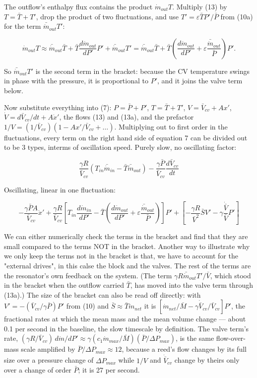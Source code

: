 \documentclass[11pt]{article}
\begin{document}
The outflow's enthalpy flux contains the product $\dot m_{out}T$. Multiply (13) by $T = \bar T + T'$, drop the product of two fluctuations, and use $T' = \varepsilon\bar TP'/\bar P$ from (10a) for the term $\bar{\dot m}_{out}T'$:

\begin{equation}
\dot m_{out}T \approx \bar{\dot m}_{out}\bar T + \bar T\frac{d\dot m_{out}}{dP'}P' + \bar{\dot m}_{out}T'
= \bar{\dot m}_{out}\bar T + \bar T\left(\frac{d\dot m_{out}}{dP'} + \varepsilon\frac{\bar{\dot m}_{out}}{\bar P}\right)P' . \tag{13a}
\end{equation}

So $\bar{\dot m}_{out}T'$ is the second term in the bracket: because the CV temperature swings in phase with the pressure, it is proportional to $P'$, and it joins the valve term below.

Now substitute everything into (7): $P = \bar P + P'$, $T = \bar T + T'$, $V = \bar V_{cv} + Ax'$, $\dot V = d\bar V_{cv}/dt + A\dot x'$, the flows (13) and (13a), and the prefactor $1/V = (1/\bar V_{cv})(1 - Ax'/\bar V_{cv} + \dots)$. Multiplying out to first order in the fluctuations, every term on the right hand side of equation 7 can be divided out to be 3 types, interms of oscillation speed. Purely slow, no oscillating factor:

\[
\frac{\gamma R}{\bar V_{cv}}\left(T_{in}\bar {\dot{m}}_{in} - \bar T\bar {\dot{m}}_{out}\right) - \frac{\gamma\bar P}{\bar V_{cv}}\frac{d\bar V_{cv}}{dt}
\]

Oscillating, linear in one fluctuation:

\[
-\frac{\gamma\bar PA}{\bar V_{cv}}\dot x' + \frac{\gamma R}{\bar V_{cv}}\left[T_{in}\frac{d\dot{m}_{in}}{dP'} - \bar T\left(\frac{d\dot{m}_{out}}{dP'} + \varepsilon\frac{\bar{\dot m}_{out}}{\bar P}\right)\right]P' + \left[-\frac{\gamma R}{\bar{V}^2} \bar{S} V' - \gamma \frac{\dot{\bar{V}}}{\bar{V}} P'\right]
\]

We can either numerically check the terms in the bracket and find that they are small compared to the terms NOT in the bracket. Another way to illustrate why we only keep the terms not in the bracket is that, we have to account for the "external drives", in this calse the block and the valves. The rest of the terms are the resonator's own feedback on the system. (The term $\gamma R\bar{\dot m}_{out}T'/\bar V$, which stood in the bracket when the outflow carried $\bar T$, has moved into the valve term through (13a).) The size of the bracket can also be read off directly: with $V' = -(\bar V_{cv}/\gamma\bar P)P'$ from (10) and $\bar S \approx \bar T\dot m_{net}$ it is $[\dot m_{net}/\bar M - \gamma\dot{\bar V}_{cv}/\bar V_{cv}]P'$, the fractional rates at which the mean mass and the mean volume change --- about 0.1 per second in the baseline, the slow timescale by definition. The valve term's rate, $(\gamma R/\bar V_{cv})\,d\dot m/dP' \approx \gamma(c_1\dot m_{max}/\bar M)(\bar P/\Delta P_{max})$, is the same flow-over-mass scale amplified by $\bar P/\Delta P_{max} \approx 12$, because a reed's flow changes by its full size over a pressure change of $\Delta P_{max}$ while $1/V$ and $\dot{\bar V}_{cv}$ change by theirs only over a change of order $\bar P$; it is 27 per second.
\end{document}
